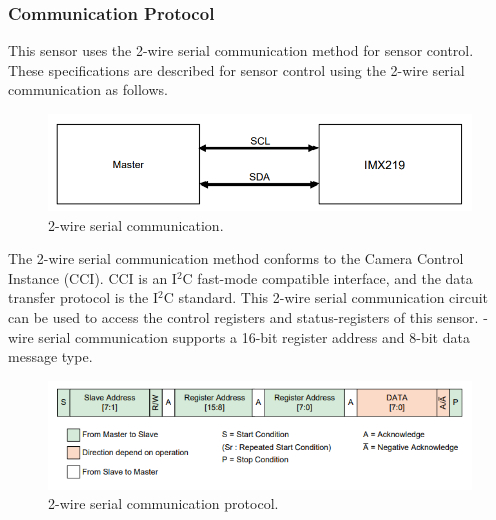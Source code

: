 \documentclass[10pt]{article}
\begin{document}
\begin{multicols}{2}
\subsubsection{Communication Protocol}
This sensor uses the 2-wire serial communication method for sensor control. These specifications are described for sensor control using the 2-wire serial communication as follows.
\begin{figure}[H]
    \centering
    \includegraphics[width=1\linewidth]{Images/Week 2/sony-imx-wire.png}
    \caption{2-wire serial communication.}
\end{figure}
The 2-wire serial communication method conforms to the Camera Control Instance (CCI). CCI is an I$^2$C fast-mode compatible interface, and the data transfer protocol is the I$^2$C standard. This 2-wire serial communication circuit can be used to access the control registers and status-registers of this sensor.
\newline {}-wire serial communication supports a 16-bit register address and 8-bit data message type.
\begin{figure}[H]
    \centering
    \includegraphics[width=1\linewidth]{Images/Week 2/2-wire-protocol.png}
    \caption{2-wire serial communication protocol.}
\end{figure}


\end{multicols}
\end{document}
